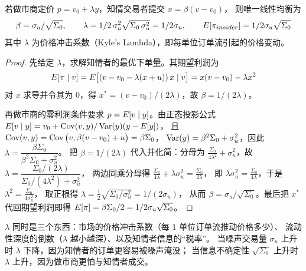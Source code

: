 \begin{theorem}\label{thm:07-kyle}
若做市商定价 $p = v_0 + \lambda y$，知情交易者提交 $x = \beta (v - v_0)$，
则唯一线性均衡为
\begin{equation}
  \beta = \sigma_u/\sqrt{\Sigma_0}, \qquad
  \lambda = 1/2\,\sigma_u^{2}\sqrt{\Sigma_0\,\sigma_u^{2}} = 1/2\sigma_u, \qquad
  E\!\left[\pi_{insider}\right] = 1/2\sigma_u\sqrt{\Sigma_0}
  \label{eq:07-kyle}
\end{equation}
其中 $\lambda$ 为价格冲击系数（Kyle's Lambda），即每单位订单流引起的价格变动。
\end{theorem}

\begin{proof}
先给定 $\lambda$，求解知情者的最优下单量。其期望利润为
\begin{equation*}
  E[\pi \mid v] = E\big[(v - v_0 - \lambda(x+u))\,x \mid v\big] = x(v - v_0) - \lambda x^{2}
\end{equation*}
对 $x$ 求导并令其为 $0$，得 $x^{*} = (v - v_0)/(2\lambda)$，故 $\beta = 1/(2\lambda)$。

再做市商的零利润条件要求 $p = E[v \mid y]$。由正态投影公式
$E[v \mid y] = v_0 + \operatorname{Cov}(v,y)/\operatorname{Var}(y)(y - E[y])$，
且 $\operatorname{Cov}(v,y) = \operatorname{Cov}\big(v, \beta(v-v_0)+u\big) = \beta\Sigma_0$，
$\operatorname{Var}(y) = \beta^{2}\Sigma_0 + \sigma_u^{2}$，因此
$\lambda = \dfrac{\beta \Sigma_0}{\beta^{2}\Sigma_0 + \sigma_u^{2}}$。
把 $\beta = 1/(2\lambda)$ 代入并化简：分母为
$\frac{\Sigma_0}{4\lambda^{2}} + \sigma_u^{2}$，故
$\lambda = \dfrac{\Sigma_0/(2\lambda)}{\Sigma_0/(4\lambda^{2}) + \sigma_u^{2}}$，
两边同乘分母得 $\frac{\Sigma_0}{4\lambda} + \lambda\sigma_u^{2} = \frac{\Sigma_0}{2\lambda}$，
即 $\lambda\sigma_u^{2} = \frac{\Sigma_0}{4\lambda}$，于是 $\lambda^{2} = \frac{\Sigma_0}{4\sigma_u^{2}}$，
取正根得 $\lambda = \frac{1}{2}\sqrt{\Sigma_0/\sigma_u^{2}} = 1/(2\sigma_u)$，
从而 $\beta = \sigma_u/\sqrt{\Sigma_0}$。最后把 $x^{*}$ 代回期望利润即得
$E[\pi] = \beta\Sigma_0/2 = 1/2\sigma_u\sqrt{\Sigma_0}$。
\end{proof}

\begin{intuitionbox}
$\lambda$ 同时是三个东西：市场的价格冲击系数（每 $1$ 单位订单流推动价格多少）、
流动性深度的倒数（$\lambda$ 越小越深）、以及知情者信息的“税率”。
当噪声交易量 $\sigma_u$ 上升时 $\lambda$ 下降，因为知情者的订单更容易被噪声淹没；
当信息不确定性 $\sqrt{\Sigma_0}$ 上升时 $\lambda$ 上升，因为做市商更怕与知情者成交。
\end{intuitionbox}


